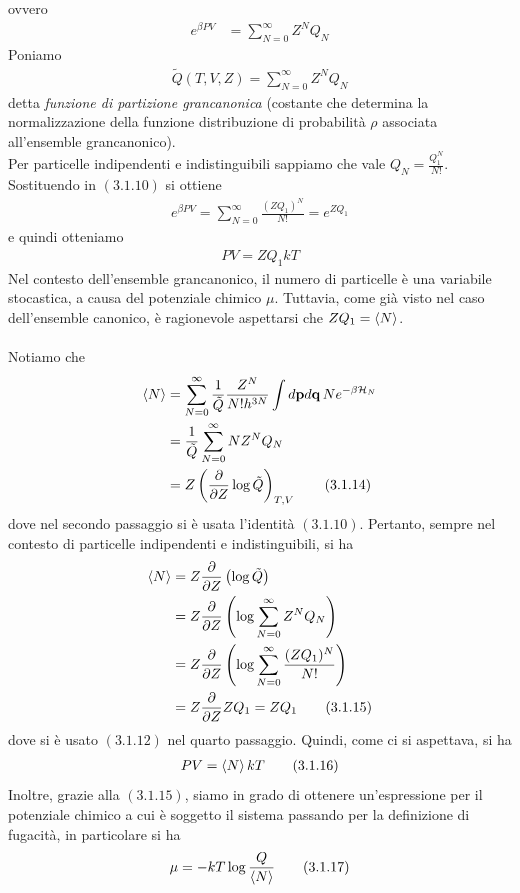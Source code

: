 \documentclass{article}
\begin{document}
ovvero 
\begin{align}
    e^{\beta PV} &= \sum_{N = 0}^\infty Z^NQ_N \tag{3.1.10}
\end{align}
Poniamo 
\begin{align}
    \tilde{Q}(T, V, Z) = \sum_{N = 0}^\infty Z^NQ_N \tag{3.1.11}
\end{align}
detta \textit{funzione di partizione grancanonica} (costante che determina la normalizzazione della funzione distribuzione di probabilità $\rho$ associata all'ensemble grancanonico). \\
Per particelle indipendenti e indistinguibili sappiamo che vale $Q_N = \frac{Q^N_1}{N!}$. Sostituendo in $(3.1.10)$ si ottiene 
\begin{align}
    e^{\beta PV} = \sum_{N = 0}^\infty \frac{(ZQ_1)^N}{N!} = e^{ZQ_1} \tag{3.1.12}
\end{align}
e quindi otteniamo 
\begin{align}
    PV = ZQ_1kT \tag{3.1.13}
\end{align}
Nel contesto dell'ensemble grancanonico, il numero di particelle è una variabile stocastica, a causa del potenziale chimico $\mu$. Tuttavia, come già visto nel caso dell'ensemble canonico, è ragionevole aspettarsi che $ZQ_1 = \braket{N}$. \\ \\
Notiamo che
\begin{align}
    \braket{N} &= \sum_{N = 0}^\infty \frac{1}{\tilde{Q}}\frac{Z^N}{N!h^{3N}}\int d\mathbf{p}d\mathbf{q} \, Ne^{-\beta \mathcal{H}_N} \notag \\
    &= \frac{1}{\tilde{Q}}\sum_{N = 0}^\infty NZ^NQ_N \notag \\
    &= Z\left(\frac{\partial}{\partial Z}\log \tilde{Q}\right)_{T, V} \tag{3.1.14}
\end{align}
dove nel secondo passaggio si è usata l'identità $(3.1.10)$. Pertanto, sempre nel contesto di particelle indipendenti e indistinguibili, si ha 
\begin{align}
    \braket{N} &= Z\frac{\partial}{\partial Z}\left(\log \tilde{Q}\right) \notag \\
    &= Z\frac{\partial}{\partial Z}\left(\log \sum_{N = 0}^\infty Z^NQ_N\right) \notag \\
    &= Z\frac{\partial}{\partial Z}\left(\log \sum_{N = 0}^\infty \frac{(ZQ_1)^N}{N!}\right) \notag \\
    &= Z\frac{\partial}{\partial Z}ZQ_1 = ZQ_1 \tag{3.1.15}
\end{align}
dove si è usato $(3.1.12)$ nel quarto passaggio. Quindi, come ci si aspettava, si ha 
\begin{align}
    PV = \braket{N}kT \tag{3.1.16}
\end{align}
Inoltre, grazie alla $(3.1.15)$, siamo in grado di ottenere un'espressione per il potenziale chimico a cui è soggetto il sistema passando per la definizione di fugacità, in particolare si ha 
\begin{align}
    \mu = -kT\log \frac{Q}{\braket{N}} \tag{3.1.17}
\end{align}
\end{document}
